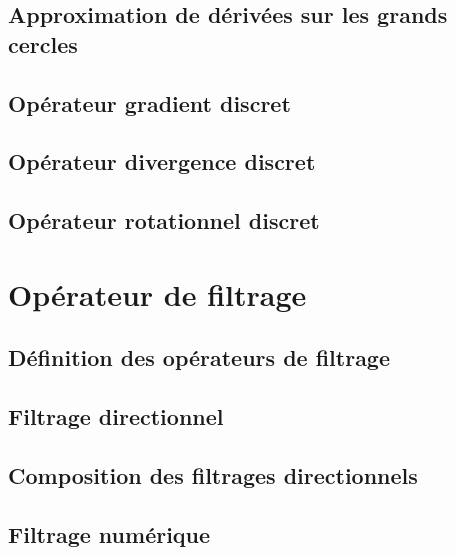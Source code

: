 \subsection{Approximation de dérivées sur les grands cercles}

\subsection{Opérateur gradient discret}

\subsection{Opérateur divergence discret}

\subsection{Opérateur rotationnel discret}

\section{Opérateur de filtrage}

\subsection{Définition des opérateurs de filtrage}

\subsection{Filtrage directionnel}

\subsection{Composition des filtrages directionnels}

\subsection{Filtrage numérique}
